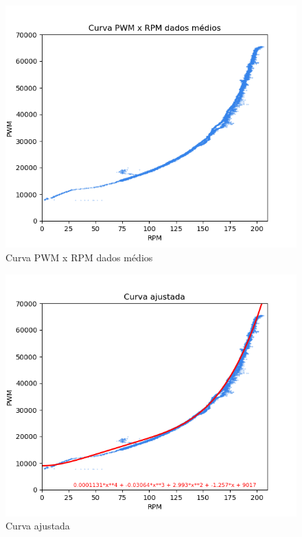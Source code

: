 \begin{figure}[h]
	\centering
	\includegraphics{figures/curva_pwm_x_rpm_dados_medios}
	\caption{Curva PWM x RPM dados médios}
	\label{fig:medicao_pwm_x_rpm_dados_medios}
\end{figure}



\begin{figure}[h]
	\centering
	\includegraphics{figures/curva_ajustada}
	\caption{Curva ajustada}
	\label{fig:curva_ajustada}
\end{figure}


